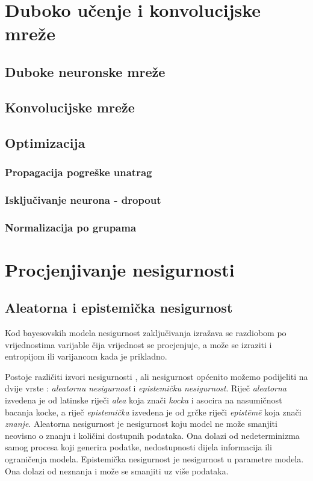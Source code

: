 \documentclass[utf8, diplomski, lmodern]{fer}
\begin{document}
\chapter{Duboko učenje i konvolucijske mreže}


\section{Duboke neuronske mreže}


\section{Konvolucijske mreže}


\section{Optimizacija}

\subsection{Propagacija pogreške unatrag}

\subsection{Isključivanje neurona - dropout}

\subsection{Normalizacija po grupama}



\chapter{Procjenjivanje nesigurnosti}


\section{Aleatorna i epistemička nesigurnost}

Kod bayesovskih modela nesigurnost zaključivanja izražava se razdiobom po vrijednostima varijable čija vrijednost se procjenjuje, a može se izraziti i entropijom ili varijancom kada je prikladno.

Postoje različiti izvori nesigurnosti \citep{Kennedy:2002:BCCM}, ali nesigurnost općenito možemo podijeliti na dvije vrste \citep{Kiureghian:2009:AEDM}: \emph{aleatornu nesigurnost} i \emph{epistemičku nesigurnost}. Riječ \textit{aleatorna} izvedena je od latinske riječi \textit{alea} koja znači \textit{kocka} i asocira na nasumičnost bacanja kocke, a riječ \textit{epistemička} izvedena je od grčke riječi \textit{epist\={e}m\={e}} koja znači \textit{znanje}. Aleatorna nesigurnost je nesigurnost koju model ne može smanjiti neovisno o znanju i količini dostupnih podataka. Ona dolazi od nedeterminizma samog procesa koji generira podatke, nedostupnosti dijela informacija ili ograničenja modela. Epistemička nesigurnost je nesigurnost u parametre modela. Ona dolazi od neznanja i može se smanjiti uz više podataka.
\end{document}
